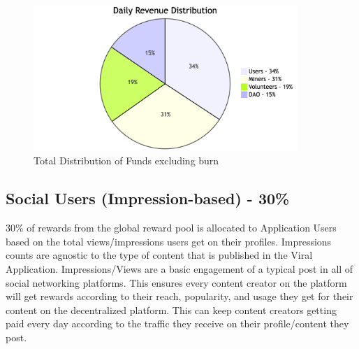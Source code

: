 \documentclass[10pt]{article}
\begin{document}
\begin{figure}[H]
\begin{center}
\includegraphics[width=10cm]{revenue-distribution}
\caption{Total Distribution of Funds excluding burn}
\end{center}
\end{figure}

\subsection{Social Users (Impression-based) - 30\%}

30\% of rewards from the global reward pool is allocated to Application Users based on the total views/impressions users get on their profiles. Impressions counts are agnostic to the type of content that is published in the Viral Application. Impressions/Views are a basic engagement of a typical post in all of social networking platforms. This ensures every content creator on the platform will get rewards according to their reach, popularity, and usage they get for their content on the decentralized platform. This can keep content creators getting paid every day according to the traffic they receive on their profile/content they post.\\
\end{document}
